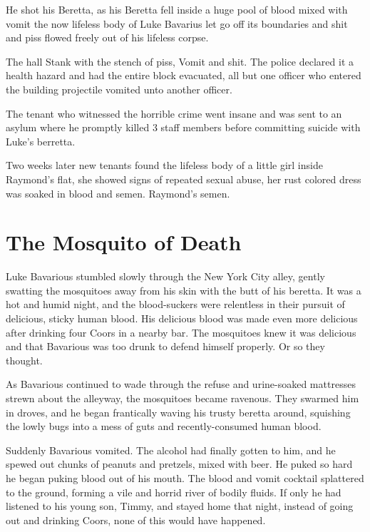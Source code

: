 He shot his Beretta, as his Beretta fell inside a huge pool of
blood mixed with vomit the now lifeless body of Luke Bavarius let
go off its boundaries and shit and piss flowed freely out of his
lifeless corpse.



The hall Stank with the stench of piss, Vomit and shit. The police
declared it a health hazard and had the entire block evacuated, all
but one officer who entered the building projectile vomited unto
another officer.



The tenant who witnessed the horrible crime went insane and was
sent to an asylum where he promptly killed 3 staff members before
committing suicide with Luke's berretta.



Two weeks later new tenants found the lifeless body of a little
girl inside Raymond's flat, she showed signs of repeated
sexual abuse, her rust colored dress was soaked in blood and semen.
Raymond's semen.


 



\chapter{The Mosquito of Death}



Luke Bavarious stumbled slowly through the New York City alley,
gently swatting the mosquitoes away from his skin with the butt of
his beretta. It was a hot and humid night, and the blood-suckers
were relentless in their pursuit of delicious, sticky human blood.
His delicious blood was made even more delicious after drinking
four Coors in a nearby bar. The mosquitoes knew it was delicious
and that Bavarious was too drunk to defend himself properly. Or so
they thought.



As Bavarious continued to wade through the refuse and urine-soaked
mattresses strewn about the alleyway, the mosquitoes became
ravenous. They swarmed him in droves, and he began frantically
waving his trusty beretta around, squishing the lowly bugs into a
mess of guts and recently-consumed human blood.



Suddenly Bavarious vomited. The alcohol had finally gotten to him,
and he spewed out chunks of peanuts and pretzels, mixed with beer.
He puked so hard he began puking blood out of his mouth. The blood
and vomit cocktail splattered to the ground, forming a vile and
horrid river of bodily fluids. If only he had listened to his young
son, Timmy, and stayed home that night, instead of going out and
drinking Coors, none of this would have happened.



